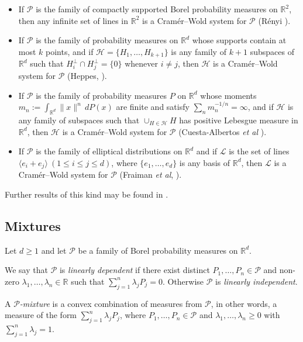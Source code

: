 \documentclass[11pt]{amsart}
\theoremstyle{plain}
\theoremstyle{remark}
\newcommand{\RR}{\mathbb{R}}
\newcommand{\cH}{\mathcal{H}}
\newcommand{\cL}{\mathcal{L}}
\newcommand{\cP}{\mathcal{P}}
\begin{document}
\begin{itemize}
\item If $\cP$ is the family of compactly supported Borel probability measures on $\RR^2$,
then any infinite set  of lines in $\RR^2$ is a Cram\'er--Wold system for $\cP$ 
(R\'enyi \cite[Theorem~1]{Re52}).
		
\item If $\cP$ is the family of probability measures on $\RR^d$
whose supports contain at most $k$ points, and if 
$\cH=\{H_1,\dots,H_{k+1}\}$ is any family of $k+1$ subspaces of  $\RR^d$ such that 
$H_i^\perp\cap H_j^\perp=\{0\}$ whenever $i\ne j$,
then $\cH$ is a Cram\'er--Wold system for $\cP$
(Heppes, \cite[Theorem~$1'$]{He56}).
		
\item If $\cP$ is the family of probability measures $P$ on $\RR^d$
whose moments $m_n:=\int_{\RR^d}\|x\|^n\,dP(x)$ are finite and satisfy $\sum_n m_n^{-1/n}=\infty$, 
and if $\cH$ is any family of subspaces such that 
$\cup_{H\in\cH}H$ has positive Lebesgue measure in $\RR^d$,
then $\cH$ is a Cram\'er--Wold system for $\cP$ (Cuesta-Albertos \textit{et al} \cite[Corollary~3.2]{CFR07}).
		
\item If $\cP$ is the family of elliptical distributions on $\RR^d$ and if
$\cL$ is the set of  lines  $\langle e_i+e_j\rangle ~(1\le i\le j\le d)$,
where $\{e_1,\dots,e_d\}$ is any basis of $\RR^d$,
then $\cL$ is a Cram\'er--Wold system for $\cP$
(Fraiman \textit{et al}, \cite[Theorem~1]{FMR23a}).
		
\end{itemize}

Further results of this kind may be found in \cite{BMR97, FMR23b, FMR24, Gi55,  GJ20}.
	
	
\subsection{Mixtures}
	
Let $d\ge1$ and let $\cP$ be a family of Borel probability measures on $\RR^d$.
	
We say that $\cP$ is \emph{linearly dependent} if there exist distinct  $P_1,\dots,P_n\in\cP$
and non-zero  $\lambda_1,\dots,\lambda_n\in\RR$ such that $\sum_{j=1}^n\lambda_j P_j=0$.
Otherwise $\cP$ is \emph{linearly independent}.
	
A \emph{$\cP$-mixture}  is a  convex combination of measures from $\cP$, 
in other words, a measure of the form $\sum_{j=1}^n\lambda_jP_j$, 
where $P_1,\dots,P_n\in\cP$ and $\lambda_1,\dots,\lambda_n\ge0$ 
with $\sum_{j=1}^n\lambda_j=1$.
	
\end{document}

